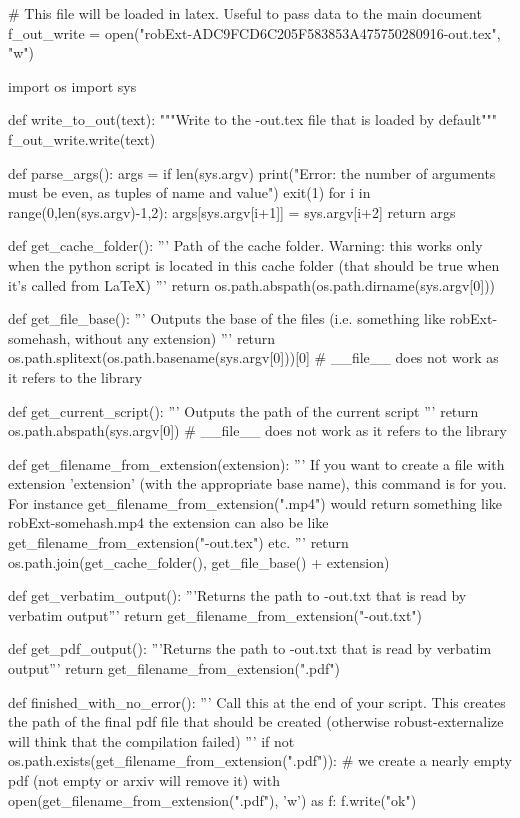 
# This file will be loaded in latex. Useful to pass data to the main document
f_out_write = open("robExt-ADC9FCD6C205F583853A475750280916-out.tex", "w")

import os
import sys

def write_to_out(text):
    """Write to the -out.tex file that is loaded by default"""
    f_out_write.write(text)

def parse_args():
    args = {}
    if len(sys.argv) %
        print("Error: the number of arguments must be even, as tuples of name and value")
        exit(1)
    for i in range(0,len(sys.argv)-1,2):
        args[sys.argv[i+1]] = sys.argv[i+2]
    return args

def get_cache_folder():
    '''
    Path of the cache folder. Warning: this works only when the python script
    is located in this cache folder (that should be true when it's called from LaTeX)
    '''
    return os.path.abspath(os.path.dirname(sys.argv[0]))

def get_file_base():
    '''
    Outputs the base of the files (i.e. something like robExt-somehash, without any extension)
    '''
    return os.path.splitext(os.path.basename(sys.argv[0]))[0] # __file__ does not work as it refers to the library

def get_current_script():
    '''
    Outputs the path of the current script
    '''
    return os.path.abspath(sys.argv[0]) # __file__ does not work as it refers to the library


def get_filename_from_extension(extension):
    '''
    If you want to create a file with extension 'extension' (with the appropriate base name), this command
    is for you. For instance get_filename_from_extension(".mp4") would return something like
    robExt-somehash.mp4
    the extension can also be like get_filename_from_extension("-out.tex") etc.
    '''
    return os.path.join(get_cache_folder(), get_file_base() + extension)

def get_verbatim_output():
    '''Returns the path to -out.txt that is read by verbatim output'''
    return get_filename_from_extension("-out.txt")

def get_pdf_output():
    '''Returns the path to -out.txt that is read by verbatim output'''
    return get_filename_from_extension(".pdf")


def finished_with_no_error():
    '''
    Call this at the end of your script. This creates the path of the final pdf file that should be
    created (otherwise robust-externalize will think that the compilation failed)
    '''
    if not os.path.exists(get_filename_from_extension(".pdf")):
        # we create a nearly empty pdf (not empty or arxiv will remove it)
        with open(get_filename_from_extension(".pdf"), 'w') as f:
            f.write("ok")

